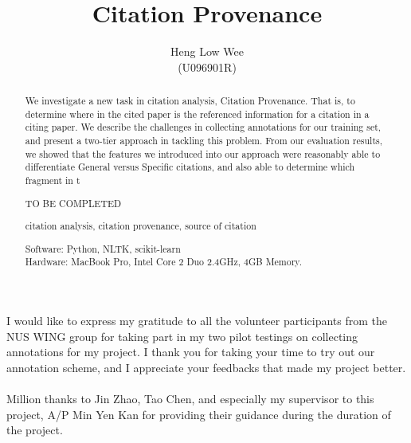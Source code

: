 \documentclass[hyp]{socreport}
\begin{document}
\title{Citation Provenance}
\author{Heng Low Wee \\ (U096901R)}
\maketitle
\begin{abstract}
\paragraph{}
We investigate a new task in citation analysis, Citation Provenance. That is, to determine where in the cited paper is the referenced information for a citation in a citing paper. We describe the challenges in collecting annotations for our training set, and present a two-tier approach in tackling this problem. From our evaluation results, we showed that the features we introduced into our approach were reasonably able to differentiate General versus Specific citations, and also able to determine which fragment in t

\begin{descriptors}
	\item TO BE COMPLETED
\end{descriptors}
\begin{keywords}
	citation analysis, citation provenance, source of citation
\end{keywords}
\begin{implement}
\begin{flushleft}
\hspace{5 mm}Software: Python, NLTK, scikit-learn\\
\hspace{5 mm}Hardware: MacBook Pro, Intel Core 2 Duo 2.4GHz, 4GB Memory.
\end{flushleft}
\end{implement}
\end{abstract}

\begin{acknowledgement}
\paragraph{}
I would like to express my gratitude to all the volunteer participants from the NUS WING group for taking part in my two pilot testings on collecting annotations for my project. I thank you for taking your time to try out our annotation scheme, and I appreciate your feedbacks that made my project better.

\paragraph{}
Million thanks to Jin Zhao, Tao Chen, and especially my supervisor to this project, A/P Min Yen Kan for providing their guidance during the duration of the project.
\end{acknowledgement}

\listoffigures
\listoftables
\tableofcontents





 




\appendix

\end{document}
